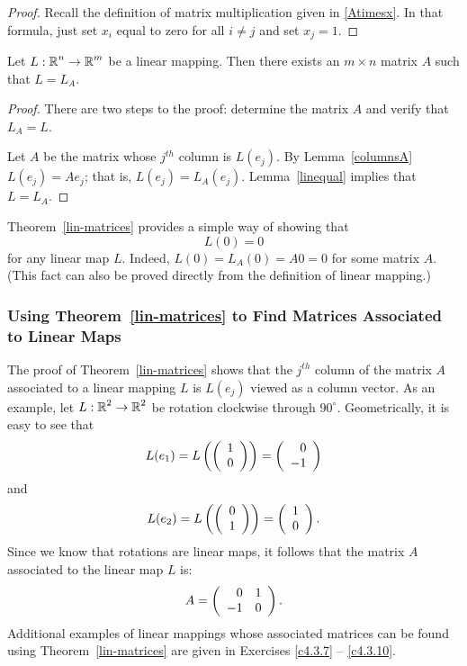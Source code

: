 \documentclass{ximera}
\begin{document}
\begin{proof}  Recall the definition of matrix multiplication given in \eqref{Atimesx}.
In that formula, just set $x_i$ equal to zero for all $i\neq j$ and set
$x_j=1$. \end{proof}

\begin{theorem}  \label{lin-matrices}
Let $L:\mbox{$\Bbb{R}$}^n\to\mbox{$\Bbb{R}$}^m$ be a linear mapping.
Then there exists an $m\times n$ matrix $A$ such that $L=L_A$.
\end{theorem}

\begin{proof}
There are two steps to the proof: determine the matrix $A$ and
verify that $L_A=L$.

Let $A$ be the matrix whose $j^{th}$ column is $L(e_j)$.  By
Lemma~\ref{columnsA} $L(e_j) = Ae_j$; that is, $L(e_j) = L_A(e_j)$.
Lemma~\ref{linequal} implies that $L=L_A$.  \end{proof}

Theorem~\ref{lin-matrices} provides a simple way of showing that
\[
L(0) = 0
\]
for any linear map $L$.  Indeed, $L(0)=L_A(0)=A0=0$ for some matrix $A$.  
(This fact can also be proved directly from the definition of linear mapping.)

\subsubsection*{Using Theorem~\protect\ref{lin-matrices} to Find Matrices
Associated to Linear Maps}

The proof of Theorem~\ref{lin-matrices} shows that the $j^{th}$ column of the
matrix $A$ associated to a linear mapping $L$ is $L(e_j)$ viewed as a column
vector.  As an example, let $L:\mbox{$\Bbb{R}$}^2\to\mbox{$\Bbb{R}$}^2$ be rotation clockwise through
$90^\circ$.  Geometrically, it is easy to see that
\[
  L(e_1) = L\left(\left(\begin{array}{r} 1 \\ 0\end{array}\right)\right) = \left(\begin{array}{r} 0 \\ -1\end{array}\right)
\]
and
\[
L(e_2) = L\left(\left(\begin{array}{r} 0 \\ 1\end{array}\right)\right) = \left(\begin{array}{r} 1 \\ 0\end{array}\right).
\]
Since we know that rotations are linear maps, it follows that the matrix
$A$ associated to the linear map $L$ is:
\[
A = \left(\begin{array}{rr} 0 & 1\\ -1 &0\end{array}\right).
\]
Additional examples of linear mappings whose associated matrices can be found
using Theorem~\ref{lin-matrices} are given in Exercises \ref{c4.3.7} --
\ref{c4.3.10}.





\end{document}
